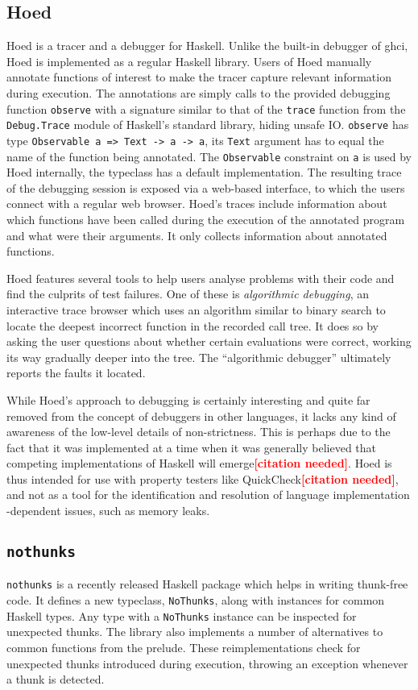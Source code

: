 \documentclass[thesis=B,english]{FITthesis}[2019/12/23]
\newcommand{\citationNeeded}{\textcolor{red}{\textbf{[citation needed]}}}
\newcommand{\hackage}[1]{\texttt{#1}}
\newcommand{\hsSignature}[1]{\texttt{#1}}
\newcommand{\hsType}[1]{\texttt{#1}}
\newcommand{\hsIdent}[1]{\texttt{#1}}
\newcommand{\hsModule}[1]{\texttt{#1}}
\newcommand{\hsTC}[1]{\texttt{#1}}
\begin{document}
\subsection*{Hoed} \label{sec:hoed}
Hoed\cite{gh-hoed} is a tracer and a debugger for Haskell. Unlike the built-in
debugger of \acrshort{ghci}, Hoed is implemented as a regular Haskell library.
Users of Hoed manually annotate functions of interest to make the tracer
capture relevant information during execution. The annotations are simply calls
to the provided debugging function \hsIdent{observe} with a signature similar
to that of the \hsIdent{trace} function from the \hsModule{Debug.Trace} module
of Haskell's standard library, hiding unsafe IO. \hsIdent{observe} has type
\hsSignature{Observable a => Text -> a -> a}, its \hsType{Text} argument has to
equal the name of the function being annotated. The \hsType{Observable}
constraint on \hsType{a} is used by Hoed internally, the typeclass has a
default implementation. The resulting trace of the debugging session is exposed
via a web-based interface, to which the users connect with a regular web
browser. Hoed's traces include information about which functions have been
called during the execution of the annotated program and what were their
arguments. It only collects information about annotated functions.

Hoed features several tools to help users analyse problems with their code and
find the culprits of test failures. One of these is \textit{algorithmic
debugging}, an interactive trace browser which uses an algorithm similar to
binary search to locate the deepest incorrect function in the recorded call
tree. It does so by asking the user questions about whether certain evaluations
were correct, working its way gradually deeper into the tree. The ``algorithmic
debugger'' ultimately reports the faults it located.

While Hoed's approach to debugging is certainly interesting and quite far
removed from the concept of debuggers in other languages, it lacks any kind of
awareness of the low-level details of non-strictness. This is perhaps due to
the fact that it was implemented at a time when it was generally believed that
competing implementations of Haskell will emerge\citationNeeded.  Hoed is thus
intended for use with property testers like QuickCheck\citationNeeded, and not
as a tool for the identification and resolution of language implementation
-dependent issues, such as memory leaks.


\subsection*{\hackage{nothunks}} \label{sec:nothunks}
\hackage{nothunks} is a recently released Haskell package which helps in writing
thunk-free code. It defines a new typeclass, \hsTC{NoThunks}, along with
instances for common Haskell types. Any type with a \hsTC{NoThunks} instance
can be inspected for unexpected thunks. The library also implements a number of
alternatives to common functions from the prelude. These re\-implementations
check for unexpected thunks introduced during execution, throwing an exception
whenever a thunk is detected.
\end{document}
